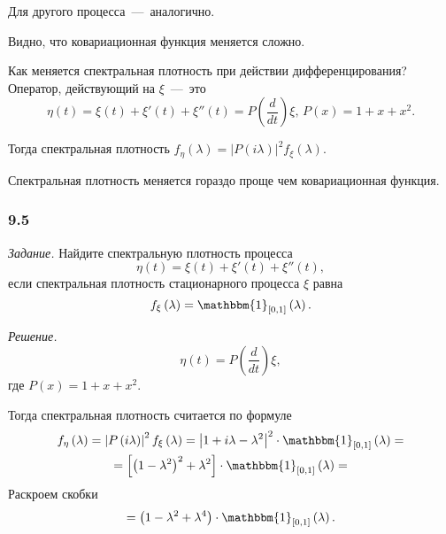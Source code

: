 Для другого процесса~---~аналогично.

Видно, что ковариационная функция меняется сложно.

Как меняется спектральная плотность при действии дифференцирования?
Оператор, действующий на $ \xi $~---~это
\begin{equation*}
  \eta \left( t \right) =
  \xi \left( t \right) + \xi' \left( t \right) + \xi'' \left( t \right) =
  P \left( \frac{d}{dt} \right) \xi, \,
  P \left( x \right) = 1 + x + x^2.
\end{equation*}

Тогда спектральная плотность
$f_{ \eta } \left( \lambda \right) =
  \left| P \left( i \lambda \right) \right|^2
  f_{ \xi } \left( \lambda \right) $.

Спектральная плотность меняется гораздо проще чем ковариационная функция.

\subsubsection*{9.5}

\textit{Задание.}
Найдите спектральную плотность процесса
\begin{equation*}
  \eta \left( t \right) =
  \xi \left( t \right) + \xi' \left( t \right) + \xi'' \left( t \right),
\end{equation*}
если спектральная плотность стационарного процесса $ \xi $ равна
\begin{equation*}
  f_{ \xi } \left( \lambda \right) =
  \mathbbm{1}_{ \left[ 0, 1 \right] } \left( \lambda \right).
\end{equation*}

\textit{Решение.}
\begin{equation*}
  \eta \left( t \right) =
  P \left( \frac{d}{dt} \right) \xi,
\end{equation*}
где $P \left( x \right) = 1 + x + x^2$.

Тогда спектральная плотность считается по формуле
\begin{gather*}
  f_{ \eta } \left( \lambda \right) =
  \left| P \left( i \lambda \right) \right|^2 f_{ \xi } \left( \lambda \right) =
  \left| 1 + i \lambda - \lambda^2 \right|^2 \cdot
  \mathbbm{1}_{ \left[ 0, 1 \right] } \left( \lambda \right) = \\
  = \left[ \left( 1 - \lambda^2 \right)^2 + \lambda^2 \right] \cdot
  \mathbbm{1}_{ \left[ 0, 1 \right] } \left( \lambda \right) =
\end{gather*}
Раскроем скобки
\begin{equation*}
  = \left( 1 - \lambda^2 + \lambda^4 \right) \cdot
  \mathbbm{1}_{ \left[ 0, 1 \right] } \left( \lambda \right).
\end{equation*}

